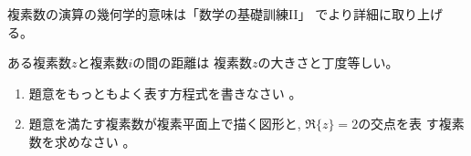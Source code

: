 \documentclass[twocolumn,11pt]{jarticle}
\begin{document}

複素数の演算の幾何学的意味は「数学の基礎訓練II」
でより詳細に取り上げる。

\nquestion
ある複素数$z$と複素数$i$の間の距離は
複素数$z$の大きさと丁度等しい。
\begin{enumerate}
\item 題意をもっともよく表す方程式を書きなさい
  。
\item 題意を満たす複素数が複素平面上で描く図形と, $\Re\{z\}=2$の交点を表
  す複素数を求めなさい
  。
\end{enumerate}
\end{document}
